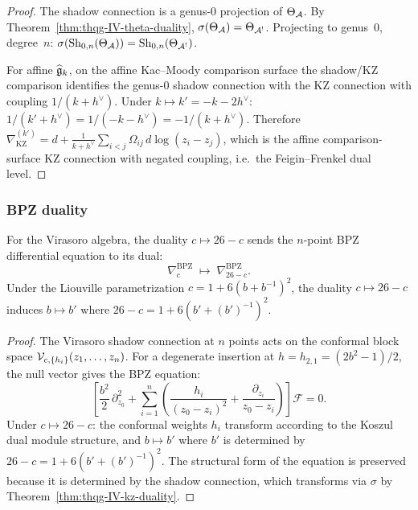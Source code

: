 \begin{proof}
The shadow connection is a genus-$0$ projection of $\Theta_{\mathcal{A}}$.
By Theorem~\ref{thm:thqg-IV-theta-duality}, $\sigma(\Theta_{\mathcal{A}}) = \Theta_{\mathcal{A}^!}$.
Projecting to genus~$0$, degree~$n$:
$\sigma(\mathrm{Sh}_{0,n}(\Theta_{\mathcal{A}})) = \mathrm{Sh}_{0,n}(\Theta_{\mathcal{A}^!})$.

For affine $\widehat{\mathfrak{g}}_k$, on the affine Kac--Moody comparison
surface the shadow/KZ comparison identifies the genus-$0$ shadow
connection with the KZ connection with coupling $1/(k + h^\vee)$. Under
$k \mapsto k' = -k - 2h^\vee$:
$1/(k' + h^\vee) = 1/(-k - h^\vee) = -1/(k + h^\vee)$.
Therefore
$\nabla_{\mathrm{KZ}}^{(k')} = d + \frac{1}{k+h^\vee}
\sum_{i<j}\Omega_{ij}\,d\log(z_i - z_j)$,
which is the affine comparison-surface KZ connection with negated
coupling, i.e.\ the Feigin--Frenkel dual level.
\end{proof}

\subsubsection{BPZ duality}

\begin{proposition}
\label{prop:thqg-IV-bpz-duality}
For the Virasoro algebra, the duality $c \mapsto 26 - c$ sends
the $n$-point BPZ differential equation to its dual:
\begin{equation}\label{eq:thqg-IV-bpz-exchange}
\nabla^{\mathrm{BPZ}}_c \;\longmapsto\; \nabla^{\mathrm{BPZ}}_{26-c}.
\end{equation}
Under the Liouville parametrization
$c = 1 + 6(b + b^{-1})^2$, the duality $c \mapsto 26 - c$
induces $b \mapsto b'$ where $26 - c = 1 + 6(b' + (b')^{-1})^2$.
\end{proposition}

\begin{proof}
The Virasoro shadow connection at $n$ points acts on the conformal
block space $\mathcal{V}_{c, \{h_i\}}(z_1, \ldots, z_n)$.
For a degenerate insertion at $h = h_{2,1} = (2b^2 - 1)/2$,
the null vector gives the BPZ equation:
\[
\left[
 \frac{b^2}{2}\,\partial_{z_0}^2
 + \sum_{i=1}^n \left(
 \frac{h_i}{(z_0 - z_i)^2}
 + \frac{\partial_{z_i}}{z_0 - z_i}
 \right)
\right]
\mathcal{F} = 0.
\]
Under $c \mapsto 26 - c$: the conformal weights $h_i$ transform
according to the Koszul dual module structure, and $b \mapsto b'$
where $b'$ is determined by $26 - c = 1 + 6(b' + (b')^{-1})^2$.
The structural form of the equation is preserved because it is
determined by the shadow connection, which transforms via
$\sigma$ by Theorem~\ref{thm:thqg-IV-kz-duality}.
\end{proof}

